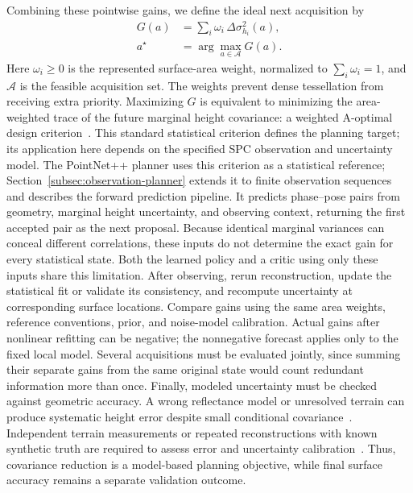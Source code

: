 Combining these pointwise gains, we define the ideal next acquisition by
\begin{equation}
    \begin{aligned}
        G(a)&=\sum_i\omega_i\,\Delta\sigma_{h_i}^2(a),\\
        a^\star&=\arg\max_{a\in\mathcal A}G(a).
    \end{aligned}
    \label{eq:uncertainty-next-view}
\end{equation}
Here $\omega_i\geq0$ is the represented surface-area weight, normalized to $\sum_i\omega_i=1$, and $\mathcal A$ is the feasible acquisition set. The weights prevent dense tessellation from receiving extra priority. Maximizing $G$ is equivalent to minimizing the area-weighted trace of the future marginal height covariance: a weighted A-optimal design criterion~\citep{huan2024design}. This standard statistical criterion defines the planning target; its application here depends on the specified SPC observation and uncertainty model.
The PointNet++ planner uses this criterion as a statistical reference; Section~\ref{subsec:observation-planner} extends it to finite observation sequences and describes the forward prediction pipeline. It predicts phase--pose pairs from geometry, marginal height uncertainty, and observing context, returning the first accepted pair as the next proposal. Because identical marginal variances can conceal different correlations, these inputs do not determine the exact gain for every statistical state. Both the learned policy and a critic using only these inputs share this limitation.
After observing, rerun reconstruction, update the statistical fit or validate its consistency, and recompute uncertainty at corresponding surface locations. Compare gains using the same area weights, reference conventions, prior, and noise-model calibration. Actual gains after nonlinear refitting can be negative; the nonnegative forecast applies only to the fixed local model. Several acquisitions must be evaluated jointly, since summing their separate gains from the same original state would count redundant information more than once.
Finally, modeled uncertainty must be checked against geometric accuracy. A wrong reflectance model or unresolved terrain can produce systematic height error despite small conditional covariance~\citep{palmer2024accuracy}. Independent terrain measurements or repeated reconstructions with known synthetic truth are required to assess error and uncertainty calibration~\citep{weirich2022,alasad2021}. Thus, covariance reduction is a model-based planning objective, while final surface accuracy remains a separate validation outcome.

